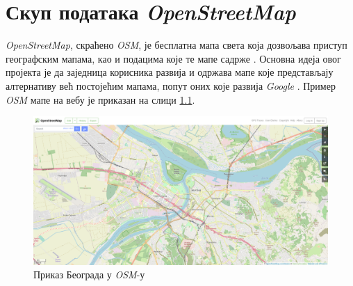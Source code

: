 \documentclass[12pt,oneside]{memoir}
\begin{document}
 %

\chapter{Скуп података \textit{OpenStreetMap}}
\label{chp:osm}

\textit{OpenStreetMap}, скраћено \textit{OSM}, је бесплатна мапа света која дозвољава приступ географским мапама, као и подацима које те мапе садрже \cite{osm_wiki}. Основна идеја овог пројекта је да заједница корисника развија и одржава мапе које представљају алтернативу већ постојећим мапама, попут оних које развија \textit{Google} \cite{google_maps}. Пример \textit{OSM} мапе на вебу је приказан на слици \ref{fig:osm_map_example}.

\begin{figure}[!ht]
  \centering
  \includegraphics[width=1\textwidth]{pictures/osm_example.png}
  \caption{Приказ Београда у \textit{OSM}-у}
  \label{fig:osm_map_example}
\end{figure}
\end{document}
